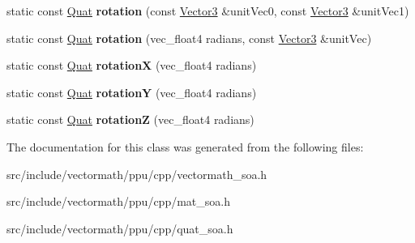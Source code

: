 \begin{DoxyCompactItemize}
\item 
\hypertarget{classVectormath_1_1Soa_1_1Quat_a3437e85a4c40601102bdae8f73159965}{static const \hyperlink{classVectormath_1_1Soa_1_1Quat}{Quat} {\bfseries rotation} (const \hyperlink{classVectormath_1_1Soa_1_1Vector3}{Vector3} \&unit\-Vec0, const \hyperlink{classVectormath_1_1Soa_1_1Vector3}{Vector3} \&unit\-Vec1)}\label{classVectormath_1_1Soa_1_1Quat_a3437e85a4c40601102bdae8f73159965}

\item 
\hypertarget{classVectormath_1_1Soa_1_1Quat_a56e962cc98f5a2ed9c129b1fc876b2d1}{static const \hyperlink{classVectormath_1_1Soa_1_1Quat}{Quat} {\bfseries rotation} (vec\-\_\-float4 radians, const \hyperlink{classVectormath_1_1Soa_1_1Vector3}{Vector3} \&unit\-Vec)}\label{classVectormath_1_1Soa_1_1Quat_a56e962cc98f5a2ed9c129b1fc876b2d1}

\item 
\hypertarget{classVectormath_1_1Soa_1_1Quat_a469add1b599a1b2c99a7073a9ea321b7}{static const \hyperlink{classVectormath_1_1Soa_1_1Quat}{Quat} {\bfseries rotation\-X} (vec\-\_\-float4 radians)}\label{classVectormath_1_1Soa_1_1Quat_a469add1b599a1b2c99a7073a9ea321b7}

\item 
\hypertarget{classVectormath_1_1Soa_1_1Quat_ade5d5cecdb33936bd7d28894f4c1be06}{static const \hyperlink{classVectormath_1_1Soa_1_1Quat}{Quat} {\bfseries rotation\-Y} (vec\-\_\-float4 radians)}\label{classVectormath_1_1Soa_1_1Quat_ade5d5cecdb33936bd7d28894f4c1be06}

\item 
\hypertarget{classVectormath_1_1Soa_1_1Quat_adfe89f097049930668c4009e241d9121}{static const \hyperlink{classVectormath_1_1Soa_1_1Quat}{Quat} {\bfseries rotation\-Z} (vec\-\_\-float4 radians)}\label{classVectormath_1_1Soa_1_1Quat_adfe89f097049930668c4009e241d9121}

\end{DoxyCompactItemize}


The documentation for this class was generated from the following files\-:\begin{DoxyCompactItemize}
\item 
src/include/vectormath/ppu/cpp/vectormath\-\_\-soa.\-h\item 
src/include/vectormath/ppu/cpp/mat\-\_\-soa.\-h\item 
src/include/vectormath/ppu/cpp/quat\-\_\-soa.\-h\end{DoxyCompactItemize}
